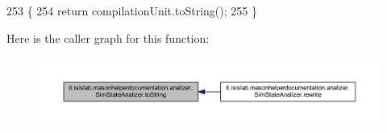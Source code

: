 \begin{DoxyCode}
253                             \{
254         \textcolor{keywordflow}{return} compilationUnit.toString();
255     \}
\end{DoxyCode}


Here is the caller graph for this function\-:
\nopagebreak
\begin{figure}[H]
\begin{center}
\leavevmode
\includegraphics[width=350pt]{classit_1_1isislab_1_1masonhelperdocumentation_1_1analizer_1_1_sim_state_analizer_adc78b00761532b2b5cc84a075a1adc5f_icgraph}
\end{center}
\end{figure}




